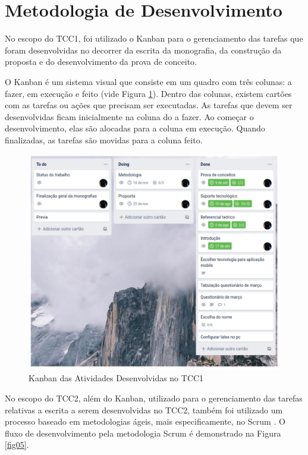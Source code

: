 \section{Metodologia de Desenvolvimento}

No escopo do TCC1, foi utilizado o Kanban para o gerenciamento das tarefas que foram 
desenvolvidas no decorrer da escrita da monografia, da construção da proposta e do desenvolvimento 
da prova de conceito.

O Kanban é um sistema visual que consiste em um quadro com três colunas: a fazer, em execução e feito (vide Figura \ref{fig04}). 
Dentro das colunas, existem cartões com as tarefas ou ações que precisam ser executadas. As tarefas que devem 
ser desenvolvidas ficam inicialmente na coluna do a fazer. Ao começar o desenvolvimento, elas são alocadas para a coluna 
em execução. Quando finalizadas, as tarefas são movidas para a coluna feito.

\begin{figure}[ht]
	\centering
	\includegraphics[keepaspectratio=true,scale=0.6]{figuras/kanban.pdf}
	\caption{Kanban das Atividades Desenvolvidas no TCC1 }
        \label{fig04}
\end{figure}

No escopo do TCC2, além do Kanban, utilizado para o gerenciamento das tarefas relativas a escrita 
a serem desenvolvidas no TCC2,
também foi utilizado um processo baseado em metodologias ágeis, mais especificamente, no Scrum \cite{scrum2017}. O fluxo de desenvolvimento 
pela metodologia Scrum é demonstrado na Figura \ref{fig05}.



